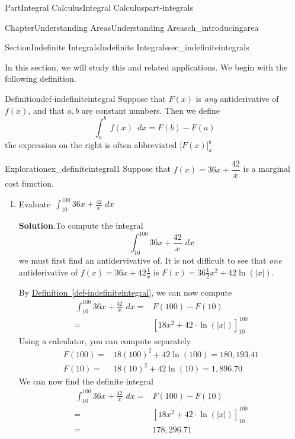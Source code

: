 \documentclass[oneside,10pt,]{tufte-book}
\newcommand{\blocktitlefont}{\relax}
\newcommand{\xreffont}{\relax}
\numberwithin{equation}{chapter}
\newcommand{\intdx}[1]{{\,\int#1\,\,dx}}
\newcommand{\amp}{&}
\begin{document}
\begin{partptx}{Part}{Integral Calculus}{}{Integral Calculus}{}{}{part-integrals}
\begin{chapterptx}{Chapter}{Understanding Areas}{}{Understanding Areas}{}{}{ch_introducingarea}
\begin{sectionptx}{Section}{Indefinite Integrals}{}{Indefinite Integrals}{}{}{sec_indefiniteintegrals}
\par
In this section, we will study this and related applications. We begin with the following definition.%
\begin{definition}{Definition}{}{def-indefiniteintegral}%
Suppose that \(F(x)\) is \emph{any} antiderivative of \(f(x)\), and that \(a,b\) are constant numbers. Then we define%
\begin{equation*}
\intdx{_a^b \, f(x)\, } = F(b) - F(a) 
\end{equation*}
the expression on the right is often abbreviated \(\Big[F(x)\Big]_a^b\)%
\end{definition}
\begin{exploration}{Exploration}{}{ex_definiteintegral1}%
Suppose that \(f(x) = 36x + \dfrac{42}{x}\) is a marginal cost function.%
\begin{enumerate}[font=\bfseries,label=(\alph*),ref=\alph*]%
\item{}Evaluate \(\displaystyle\intdx{_{10}^{100} 36x + \frac{42}{x}}\)%
\par\smallskip%
\noindent\textbf{\blocktitlefont Solution}.\hypertarget{ex_definiteintegral1-2-2}{}\quad{}To compute the integral%
\begin{equation*}
\intdx{_{10}^{100} 36x + \frac{42}{x}} 
\end{equation*}
we must first find an antidervivative of.  It is not difficult to see that \emph{one} antiderivative of \(f(x) = 36x + 42\frac{1}{x}\) is \(F(x) = 36\frac{1}{2}x^2 + 42\ln(|x|)\).%
\par
By \hyperref[def-indefiniteintegral]{Definition~{\xreffont\ref{def-indefiniteintegral}}}, we can now compute%
\begin{align*}
\intdx{_{10}^{100} 36x + \frac{42}{x}}  = \amp F(100) - F(10) \\
= \amp [18x^2 + 42\cdot \ln(|x|)]_{10}^{100}
\end{align*}
Using a calculator, you can compute separately%
\begin{align*}
F(100) = \amp 18 (100)^2 + 42\ln(100) = 180,193.41\\
F(10) = \amp 18 (10)^2 + 42\ln(10) = 1,896.70
\end{align*}
We can now find the definite integral%
\begin{align*}
\intdx{_{10}^{100} 36x + \frac{42}{x}}  = \amp F(100) - F(10) \\
= \amp [18x^2 + 42\cdot \ln(|x|)]_{10}^{100}\\
= \amp 178,296.71 
\end{align*}

\end{enumerate}
\end{exploration}
\end{sectionptx}
\end{chapterptx}
\end{partptx}
\end{document}
